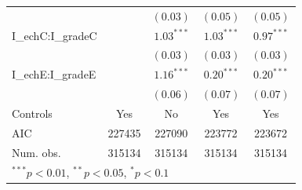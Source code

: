\documentclass[xcolor=table,ignorenonframetext,12pt]{beamer}
\newenvironment{choixmarges}[2]{\begin{list}{}{%
\setlength{\topsep}{0pt}%
\setlength{\leftmargin}{0pt}%
\setlength{\rightmargin}{0pt}%
\setlength{\listparindent}{\parindent}%
\setlength{\itemindent}{\parindent}%
\setlength{\parsep}{0pt plus 1pt}%
\addtolength{\leftmargin}{#1}%
\addtolength{\rightmargin}{#2}%
}\item }{\end{list}}
\begin{document}
\begin{frame}
\begin{choixmarges}{-0.5cm}{-0.5cm}
\begin{table}
\begin{center}
{\begin{tabular}{l c c c c }
                  &               & $(0.03)$      & $(0.05)$     & $(0.05)$      \\
I\_echC:I\_gradeC &               & $1.03^{***}$  & $1.03^{***}$ & $0.97^{***}$  \\
                  &               & $(0.03)$      & $(0.03)$     & $(0.03)$      \\
I\_echE:I\_gradeE &               & $1.16^{***}$  & $0.20^{***}$ & $0.20^{***}$  \\
                  &               & $(0.06)$      & $(0.07)$     & $(0.07)$      \\
\midrule
Controls  		  & Yes  & No    & Yes &  Yes \\
\midrule
AIC               & 227435     & 227090    & 223772    & 223672     \\
Num. obs.         & 315134        & 315134        & 315134       & 315134        \\
\bottomrule
\multicolumn{5}{l}{\scriptsize{$^{***}p<0.01$, $^{**}p<0.05$, $^*p<0.1$}} 
\end{tabular}}
\end{center}
\end{table}


\end{choixmarges}

\end{frame}
\end{document}
